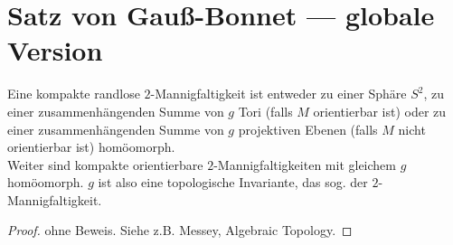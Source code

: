 \section{Satz von Gauß-Bonnet --- globale Version}

\begin{theorem}
  Eine kompakte randlose \( 2 \)-Mannigfaltigkeit ist entweder zu einer Sphäre \( S^2 \), zu einer zusammenhängenden Summe von \( g \) Tori (falls \( M \) orientierbar ist) oder zu einer zusammenhängenden Summe von \( g \) projektiven Ebenen (falls \( M \) nicht orientierbar ist) homöomorph. \\
  Weiter sind kompakte orientierbare \( 2 \)-Mannigfaltigkeiten mit gleichem \( g \) homöomorph. \( g \) ist also eine topologische Invariante, das sog. \label{def:geschlecht} der \( 2 \)-Mannigfaltigkeit.
  \begin{proof}
    ohne Beweis. Siehe z.B. Messey, Algebraic Topology.
  \end{proof}
\end{theorem}